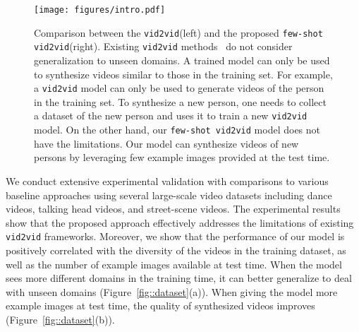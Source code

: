 \documentclass{article}
\newcommand{\vidtovid}{{\texttt{vid2vid}}\xspace}
\newcommand{\fewshotvidtovid}{{\texttt{few-shot vid2vid}}\xspace}
\begin{document}
\begin{figure}
\centering
\texttt{[image: figures/intro.pdf]}
\vspace{-2mm}
\caption{Comparison between the \vidtovid (left) and the proposed \fewshotvidtovid (right). Existing \vidtovid methods~\cite{chan2018everybody,gafni2019vid2game,wang2018video} do not consider generalization to unseen domains. A trained model can only be used to synthesize videos similar to those in the training set. For example, a \vidtovid model can only be used to generate videos of the person in the training set. To synthesize a new person, one needs to collect a dataset of the new person and uses it to train a new \vidtovid model. On the other hand, our \fewshotvidtovid model does not have the limitations. Our model can synthesize videos of new persons by leveraging few example images provided at the test time. 
}
\label{fig::vid}
\vspace{-3mm}
\end{figure} 

We conduct extensive experimental validation with comparisons to various baseline approaches using several large-scale video datasets including dance videos, talking head videos, and street-scene videos. The experimental results show that the proposed approach effectively addresses the limitations of existing \vidtovid frameworks. Moreover, we show that the performance of our model is positively correlated with the diversity of the videos in the training dataset, as well as the number of example images available at test time. When the model sees more different domains in the training time, it can better generalize to deal with unseen domains (Figure~\ref{fig::dataset}(a)). When giving the model more example images at test time, the quality of synthesized videos improves (Figure~\ref{fig::dataset}(b)).

 \vspace{-3mm}
\end{document}
